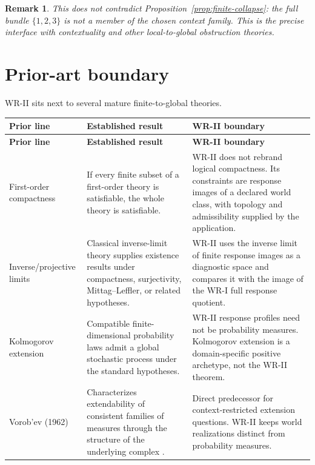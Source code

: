 \documentclass[11pt]{article}
\newtheorem{remark}[definition]{Remark}
\begin{document}
\begin{remark}
This does not contradict Proposition~\ref{prop:finite-collapse}: the full
bundle $\{1,2,3\}$ is not a member of the chosen context family. This is the
precise interface with contextuality and other local-to-global obstruction
theories.
\end{remark}

\section{Prior-art boundary}

WR-II sits next to several mature finite-to-global theories.

\begin{longtable}{>{\raggedright\arraybackslash}p{}
                  >{\raggedright\arraybackslash}p{}
                  >{\raggedright\arraybackslash}p{}}
\toprule
\textbf{Prior line} & \textbf{Established result} & \textbf{WR-II boundary}\\
\midrule
\endfirsthead
\toprule
\textbf{Prior line} & \textbf{Established result} & \textbf{WR-II boundary}\\
\midrule
\endhead

First-order compactness &
If every finite subset of a first-order theory is satisfiable, the whole theory
is satisfiable. &
WR-II does not rebrand logical compactness. Its constraints are response images
of a declared world class, with topology and admissibility supplied by the
application. \\[5pt]

Inverse/projective limits &
Classical inverse-limit theory supplies existence results under compactness,
surjectivity, Mittag--Leffler, or related hypotheses. &
WR-II uses the inverse limit of finite response images as a diagnostic space and
compares it with the image of the WR-I full response quotient. \\[5pt]

Kolmogorov extension &
Compatible finite-dimensional probability laws admit a global stochastic
process under the standard hypotheses. &
WR-II response profiles need not be probability measures. Kolmogorov extension
is a domain-specific positive archetype, not the WR-II theorem. \\[5pt]

Vorob'ev (1962) &
Characterizes extendability of consistent families of measures through the
structure of the underlying complex \cite{Vorobev1962}. &
Direct predecessor for context-restricted extension questions. WR-II keeps
world realizations distinct from probability measures. \\[5pt]


\end{longtable}
\end{document}
